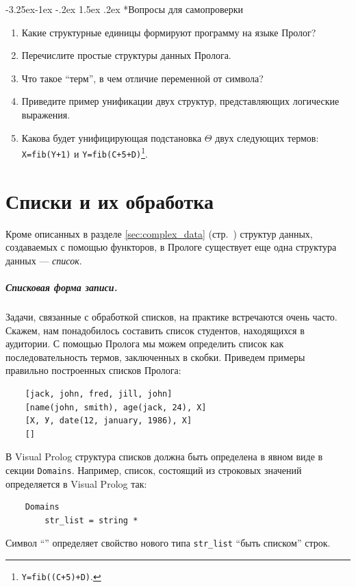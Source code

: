 \documentclass[12pt, openany, twoside]{book} %
\makeatletter
\renewcommand\subsubsection{\@startsection{subsubsection}{3}{\z@}%
                                     {-3.25ex\@plus -1ex \@minus -.2ex}%
                                     {1.5ex \@plus .2ex}%
                                     {\normalfont\normalsize\bfseries}}
\newenvironment{questions}{\subsubsection*{Вопросы для самопроверки}\begin{enumerate}}{\end{enumerate}}
\makeatother
\begin{document}
\begin{questions}
\item{} Какие структурные единицы формируют программу на языке Пролог?
\item{} Перечислите простые структуры данных Пролога.
\item{} Что такое ``терм'', в чем отличие переменной от символа?
\item{} Приведите пример унификации двух структур, представляющих логические выражения.
\item{} Какова будет унифицирующая подстановка $\Theta$ двух следующих термов: \texttt{X=fib(Y+1)} и \texttt{Y=fib(C+5+D)}\footnote{\texttt{Y=fib((C+5)+D)}.}.
\end{questions}

\chapter{Списки и их обработка}

Кроме описанных в разделе \ref{sec:complex_data} (стр.~\pageref{sec:complex_data}) структур данных, создаваемых с помощью функторов, в Прологе существует еще одна структура данных --- {\em список}.

\paragraph{Списковая форма записи.} Задачи, связанные с обработкой списков, на практике встречаются очень часто. Скажем, нам понадобилось составить список студентов, находящихся в аудитории. С помощью Пролога мы можем определить список как последовательность термов, заключенных в скобки. Приведем примеры правильно построенных списков Пролога:

{\tt\begin{verbatim}
    [jack, john, fred, jill, john]
    [name(john, smith), age(jack, 24), X]
    [Х, У, date(12, january, 1986), Х]
    []
\end{verbatim}}
\noindent В Visual Prolog структура списков должна быть определена в явном виде в секции {\tt Domains}. Например, список, состоящий из строковых значений определяется в Visual Prolog так:
{\tt\begin{verbatim}
    Domains
        str_list = string *
\end{verbatim}}
\noindent Символ ``{\tt *}'' определяет свойство нового типа {\tt str\_list} ``быть списком'' строк.
\end{document}
